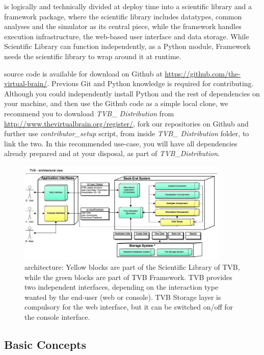 
\TVB is logically and technically divided at deploy time into a scientific library and a framework package, 
where the scientific library includes datatypes, common analyses and the simulator as its central piece,
while the framework handles execution infrastructure, the web-based user interface and data storage. 
While \TVB Scientific Library can function independently, as a Python module, \TVB Framework needs 
the scientific library to wrap around it at runtime.

\TVB source code is available for download on Github at \url{https://github.com/the-virtual-brain/}. 
Previous Git and Python knowledge is required for contributing.
Although you could independently install Python and the rest of \TVB dependencies on your machine, 
and then use the Github code as a simple local clone, we recommend you to download \emph{TVB\_ Distribution}
from \url{http://www.thevirtualbrain.org/register/}, fork our repositories on Github and further use
\emph{contributor\_setup} script, from inside \emph{TVB\_ Distribution} folder, to link the two. 
In this recommended use-case, you will have all \TVB dependencies already prepared and at your disposal, 
as part of \emph{TVB\_Distribution}.

 \begin{figure}
        \centering
        \includegraphics[width=0.90\textwidth]{images/architecture.jpg}
        \caption{\TVB architecture: 
        Yellow blocks are part of the Scientific Library of TVB, while the green blocks are part of TVB Framework.
        TVB provides two independent interfaces, depending on the interaction type wanted by the end-user (web or console).
        TVB Storage layer is compulsory for the web interface, but it can be switched on/off for the console interface.
         }
        \label{fig:architecture}
 \end{figure}

	\subsection{Basic Concepts}

